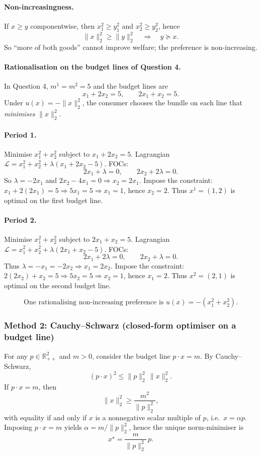 \documentclass[12pt]{article}
\begin{document}
\paragraph{Non-increasingness.}
If \(x\ge y\) componentwise, then \(x_1^2\ge y_1^2\) and \(x_2^2\ge y_2^2\), hence
\[
\|x\|_2^2 \ge \|y\|_2^2 \quad\Rightarrow\quad y\succeq x.
\]
So ``more of both goods'' cannot improve welfare; the preference is non-increasing.

\paragraph{Rationalisation on the budget lines of Question 4.}
In Question 4, \(m^1=m^2=5\) and the budget lines are
\[
x_1+2x_2=5,\qquad 2x_1+x_2=5.
\]
Under \(u(x)=-\|x\|_2^2\), the consumer chooses the bundle on each line that \emph{minimises} \(\|x\|_2^2\).

\paragraph{Period 1.}
Minimise \(x_1^2+x_2^2\) subject to \(x_1+2x_2=5\).
Lagrangian \(\mathcal{L}=x_1^2+x_2^2+\lambda(x_1+2x_2-5)\).
FOCs:
\[
2x_1+\lambda=0,\qquad 2x_2+2\lambda=0.
\]
So \(\lambda=-2x_1\) and \(2x_2-4x_1=0\Rightarrow x_2=2x_1\).
Impose the constraint: \(x_1+2(2x_1)=5\Rightarrow 5x_1=5\Rightarrow x_1=1\), hence \(x_2=2\).
Thus \(x^1=(1,2)\) is optimal on the first budget line.

\paragraph{Period 2.}
Minimise \(x_1^2+x_2^2\) subject to \(2x_1+x_2=5\).
Lagrangian \(\mathcal{L}=x_1^2+x_2^2+\lambda(2x_1+x_2-5)\).
FOCs:
\[
2x_1+2\lambda=0,\qquad 2x_2+\lambda=0.
\]
Thus \(\lambda=-x_1=-2x_2\Rightarrow x_1=2x_2\).
Impose the constraint: \(2(2x_2)+x_2=5\Rightarrow 5x_2=5\Rightarrow x_2=1\), hence \(x_1=2\).
Thus \(x^2=(2,1)\) is optimal on the second budget line.

\[
\boxed{\text{One rationalising non-increasing preference is } u(x)=-(x_1^2+x_2^2).}
\]

\subsubsection*{Method 2: Cauchy--Schwarz (closed-form optimiser on a budget line)}
For any \(p\in\mathbb{R}^2_{++}\) and \(m>0\), consider the budget line \(p\cdot x=m\).
By Cauchy--Schwarz,
\[
(p\cdot x)^2 \le \|p\|_2^2\,\|x\|_2^2.
\]
If \(p\cdot x=m\), then
\[
\|x\|_2^2 \ge \frac{m^2}{\|p\|_2^2},
\]
with equality if and only if \(x\) is a nonnegative scalar multiple of \(p\), i.e.\ \(x=\alpha p\).
Imposing \(p\cdot x=m\) yields \(\alpha=m/\|p\|_2^2\), hence the unique norm-minimiser is
\[
x^\star=\frac{m}{\|p\|_2^2}\,p.
\]
\end{document}
